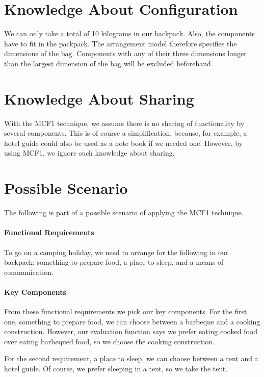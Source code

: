 \documentclass[a4paper,11pt]{article}
\begin{document}
\section{Knowledge About Configuration}

We can only take a total of 10 kilograms in our backpack.
Also, the components have to fit in the packpack.
The arrangement model therefore specifies the dimensions of the bag. 
Components with any of their three dimensions longer than the largest dimension 
of the bag will be excluded beforehand.


\section{Knowledge About Sharing}

With the MCF1 technique, we assume there is no sharing of functionality by
several components. This is of course a simplification, because, for example, a
hotel guide could also be used as a note book if we needed one. However, by
using MCF1, we ignore such knowledge about sharing.


\section{Possible Scenario}

The following is part of a possible scenario of applying the
MCF1 technique.

\paragraph{Functional Requirements}

To go on a camping holiday, we need to arrange for the following
in our backpack: something to prepare food, a place to sleep, and
a means of communication.

\paragraph{Key Components}

From these functional requirements we pick our key components. For
the first one, something to prepare food, we can choose between a
barbeque and a cooking construction. However, our evaluation
function says we prefer eating cooked food over eating barbequed
food, so we choose the cooking construction.

For the second requirement, a place to sleep, we can choose between
a tent and a hotel guide. Of course, we prefer sleeping in a tent,
so we take the tent.
\end{document}
